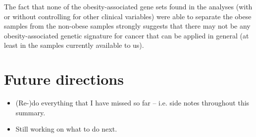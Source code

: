 \documentclass[a4paper, 11pt]{article}
\begin{document}
The fact that none of the obesity-associated gene sets found in the analyses (with or without controlling for other clinical variables) were able to separate the obese samples from the non-obese samples strongly suggests that there may not be any obesity-associated genetic signature for cancer that can be applied in general (at least in the samples currently available to us).\\




\section*{Future directions}

\begin{itemize}
	\item (Re-)do everything that I have missed so far -- i.e. side notes throughout this summary.
		\item Still working on what to do next.
\end{itemize}
\end{document}
